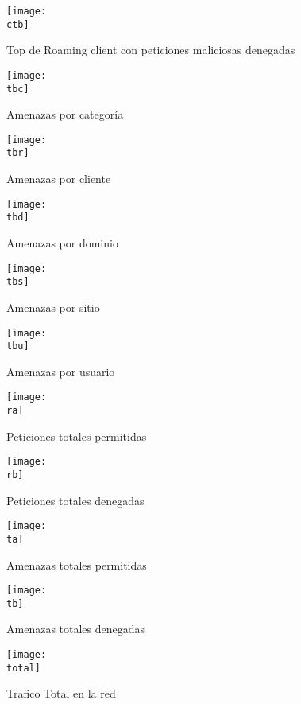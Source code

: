 \documentclass[a4paper]{article}
\newcommand{\ctb}{img/client-threat-block.png}
\newcommand{\tbc}{img/threats-category.pdf}
\newcommand{\tbd}{img/threats-domain.pdf}
\newcommand{\tbr}{img/threats-client.pdf}
\newcommand{\tbs}{img/threats-site.pdf}
\newcommand{\tbu}{img/threats-user.pdf}
\newcommand{\ra}{img/requestAllow.png}
\newcommand{\rb}{img/requestBlock.png}
\newcommand{\ta}{img/threatAllow.png}
\newcommand{\tb}{img/threatBlock.png}
\newcommand{\total}{img/traficoTotal.png}
\begin{document}
    \begin{figure}[H]
        \centering
        \texttt{[image: \\ctb]}
        \caption{Top de Roaming client con peticiones maliciosas denegadas}
    \end{figure}

    \begin{figure}[H]
        \centering
        \texttt{[image: \\tbc]}
        \caption{Amenazas por categoría}
    \end{figure}

    \begin{figure}[H]
        \centering
        \texttt{[image: \\tbr]}
        \caption{Amenazas por cliente}
    \end{figure}   

    \begin{figure}[H]
        \centering
        \texttt{[image: \\tbd]}
        \caption{Amenazas por dominio}
    \end{figure}    
    
    \begin{figure}[H]
        \centering
        \texttt{[image: \\tbs]}
        \caption{Amenazas por sitio}
    \end{figure}

    \begin{figure}[H]
        \centering
        \texttt{[image: \\tbu]}
        \caption{Amenazas por usuario}
    \end{figure}
    
    \begin{figure}[H]
        \centering
        \texttt{[image: \\ra]}
        \caption{Peticiones totales permitidas}
    \end{figure}
    
    \begin{figure}[H]
        \centering
        \texttt{[image: \\rb]}
        \caption{Peticiones totales denegadas}
    \end{figure}

    \begin{figure}[H]
        \centering
        \texttt{[image: \\ta]}
        \caption{Amenazas totales permitidas}
    \end{figure}

    \begin{figure}[H]
        \centering
        \texttt{[image: \\tb]}
        \caption{Amenazas totales denegadas}
    \end{figure}
    
    \begin{figure}[H]
        \centering
        \texttt{[image: \\total]}
        \caption{Trafico Total en la red}
    \end{figure} 
    
\end{document}
